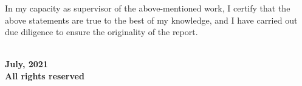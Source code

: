 \vspace{20mm}
 \qquad
\vspace{20mm}

\noindent In my capacity as supervisor of the above-mentioned work, I certify
that the above statements are true to the best of my knowledge, and
I have carried out due diligence to ensure the originality of the report.

\vspace{20mm}

 \qquad


\blankpage

\vspace*{\fill}
\begin{center}
\large\bf \textcopyright \ \myname\\
\large\bf July, 2021\\
\large\bf All rights reserved
\end{center}
\vspace*{\fill}
\thispagestyle{empty}


%



